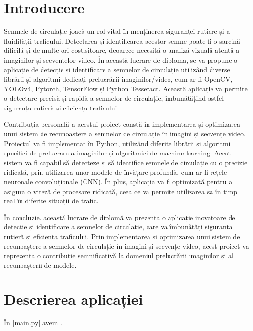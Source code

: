 \documentclass[12pt, a4paper, twoside, romanian]{teza-etti}
\begin{document}
\beforepreface{}
\listoffigures
\listoftables
{}
\afterpreface{}

\chapter{Introducere}
Semnele de circulație joacă un rol vital în menținerea siguranței rutiere și a fluidității traficului.
Detectarea și identificarea acestor semne poate fi o sarcină dificilă și de multe ori costisitoare,
deoarece necesită o analiză vizuală atentă a imaginilor și secvențelor video.
În această lucrare de diploma, se va propune o aplicație de detecție și identificare a semnelor de circulație utilizând diverse librării și algoritmi dedicați prelucrării imaginilor/video, cum ar fi OpenCV, YOLOv4, Pytorch, TensorFlow și Python Tesseract. Această aplicație va permite o detectare precisă și rapidă a semnelor de circulație, îmbunătățind astfel siguranța rutieră și eficiența traficului.

Contribuția personală a acestui proiect constă în implementarea și optimizarea unui sistem de recunoaștere a semnelor de circulație în imagini și secvențe video. Proiectul va fi implementat în Python, utilizând diferite librării și algoritmi specifici de prelucrare a imaginilor și algoritmici de machine learning. Acest sistem va fi capabil să detecteze și să identifice semnele de circulație cu o precizie ridicată, prin utilizarea unor modele de învățare profundă, cum ar fi rețele neuronale convoluționale (CNN). În plus, aplicația va fi optimizată pentru a asigura o viteză de procesare ridicată, ceea ce va permite utilizarea sa în timp real în diferite situații de trafic.

În concluzie, această lucrare de diplomă va prezenta o aplicație inovatoare de detecție și identificare a semnelor de circulație, care va îmbunătăți siguranța rutieră și eficiența traficului. Prin implementarea și optimizarea unui sistem de recunoaștere a semnelor de circulație în imagini și secvențe video, acest proiect va reprezenta o contribuție semnificativă la domeniul prelucrării imaginilor și al recunoașterii de modele.

\chapter{Descrierea aplicației}
În {\ref{main.py}} avem \LineCount.
\appendix
\end{document}
